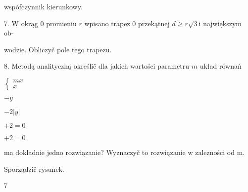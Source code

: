 \documentclass[a4paper,12pt]{article}
\begin{document}
wspófczynnik kierunkowy.

7. $\mathrm{W}$ okrąg $0$ promieniu $r$ wpisano trapez $0$ przekątnej $d\geq r\sqrt{3}\mathrm{i}$ największym ob-

wodzie. Obliczyč pole tego trapezu.

8. Metodą analityczną określič dla jakich wartości parametru $m$ układ równań

$\left\{\begin{array}{l}
mx\\
x
\end{array}\right.$

$-y$

$-2|y|$

$+2=0$

$+2=0$

ma dokladnie jedno rozwiązanie? Wyznaczyč to rozwiązanie w zalezności od m.

Sporządzič rysunek.

7
\end{document}
